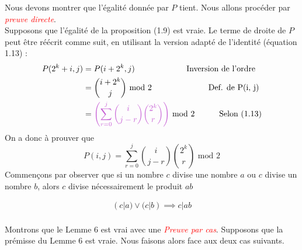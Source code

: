 \documentclass[16pt]{report}
\begin{document}
\begin{multicols*}{2}
        \begin{Preuve*}{}{}
            Nous devons montrer que l'égalité donnée par $P$ tient. Nous allons procéder 
            par \textcolor{red}{\textit{preuve directe}}. 
            \vspace{1em} \\ 
            Supposons que l'égalité de la proposition (1.9) est vraie. 
            Le terme de droite de $P$ peut être réécrit comme suit, en utilisant 
            la version adapté de l'identité (équation 1.13) : 
            \begin{align*}
                P(2^k + i, j)    &= P(i + 2^k, j) 
                                \quad\quad\quad\quad\quad\quad \text{ Inversion de l'ordre } 
                                \\
                                &={i + 2^k \choose j} \text{ mod } 2 \text{ \quad\quad\quad\quad\quad\quad\; 
                Def.  de P(i, j)} 
                \\ 
                              &= \textcolor{myp}{\left( \sum_{r=0}^{j} {i \choose j-r} {2^k \choose r} \right)}
                              \text{ mod } 2 \quad\quad\quad 
                              \text{Selon (1.13)}
            \end{align*}
            On a donc à prouver que 
            \[ P(i, j) = \sum_{r=0}^{j} {i \choose j-r} {2^k \choose r} \text{ mod } 2   \]
            Commençons par observer que si un nombre $c$ divise une nombre $a$ ou 
            $c$ divise un nombre $b$, alors $c$ divise nécessairement le produit 
            $ab$   
            \begin{Lemme}{}{}
                \begin{align*}
                            (c|a) \lor (c|b) \implies c|ab
                \end{align*}
            \end{Lemme}   
            \paragraph{}
            Montrons que le Lemme 6 est vrai avec une \textit{\textcolor{red}{Preuve par cas}}. 
            Supposons que la prémisse du Lemme 6 est vraie. Nous faisons alors face 
            aux deux cas suivants.


\end{Preuve*}
\end{multicols*}
\end{document}

